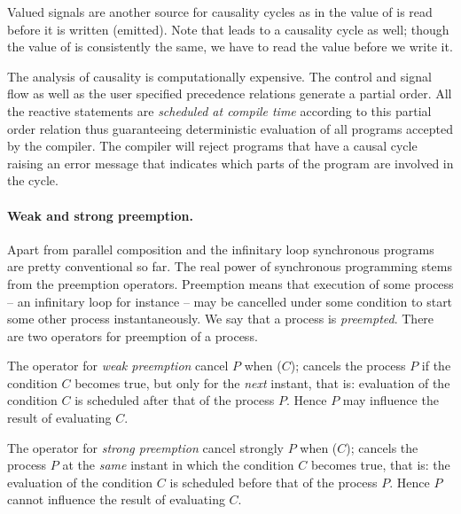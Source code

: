 Valued signals are another source for causality cycles as in
%
% 
the value of  is read before it is written (emitted). Note that
% 
% 
leads to a causality cycle as well; though the value of  is 
consistently the same, we have to read the value before we write it.

The analysis of causality is computationally expensive.  The control
and signal flow as well as the user specified precedence relations
generate a partial order.  All the reactive
statements are \emph{scheduled at compile time} according to this
partial order relation thus guaranteeing deterministic evaluation of
all programs accepted by the compiler.
The compiler will reject programs that have a causal cycle raising an
error message that indicates which parts of the program are involved
in the cycle.

\paragraph{Weak and strong preemption.} Apart from 
parallel composition and the infinitary loop synchronous programs are 
pretty conventional so far. The real power of synchronous programming 
stems from the preemption operators. Preemption means that execution 
of some process  --  an infinitary loop for instance -- may be 
cancelled under some condition to start some other process 
instantaneously. We say that a process is \emph{preempted}.  There 
are two operators for preemption of a process.

The operator for \textit{weak preemption}
%
\BEP
cancel $P$ when ($C$);
\EEP
%
cancels the process $P$ if the condition $C$ becomes true, but only 
for the \emph{next} instant, that is: evaluation of the condition $C$ 
is scheduled after that of the process $P$.  Hence $P$ may influence 
the result of evaluating $C$.

The operator for \textit{strong preemption}
%
\BEP
cancel strongly $P$ when ($C$);
\EEP
%
cancels the process $P$ at the \emph{same} instant in which the
condition $C$ becomes true, that is: the evaluation of the condition 
$C$ is scheduled before that of the process $P$.  Hence $P$ cannot 
influence the result of evaluating $C$.

